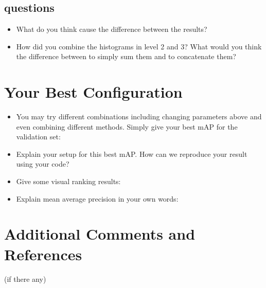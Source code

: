 \documentclass[12pt]{article}
\begin{document}
\subsection{questions}
\begin{itemize}
\item What do you think cause the difference between the results?
\item How did you combine the histograms in level 2 and 3? What would you think the difference between to simply sum them and to concatenate them?
\end{itemize}

\section{Your Best Configuration}
\begin{itemize}
\item You may try different combinations including changing parameters above and even combining different methods. Simply give your best mAP for the validation set:


\item Explain your setup for this best mAP. How can we reproduce your result using your code?

\item Give some visual ranking results:

\item Explain mean average precision in your own words:
\end{itemize}

\section{Additional Comments and References}

(if there any)
\end{document}

